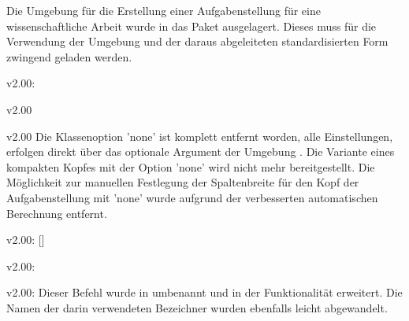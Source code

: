 \minisec{\taskname}
\begin{Bundle}{}
Die Umgebung für die Erstellung einer Aufgabenstellung für eine 
wissenschaftliche Arbeit wurde in das Paket  
ausgelagert. Dieses muss für die Verwendung der Umgebung  
und der daraus abgeleiteten standardisierten Form zwingend geladen werden.

\begin{Obsolete}{v2.00:}{}
\begin{Obsolete}{v2.00}{}
\begin{Obsolete}{v2.00}{}
\printobsoletelist%
%
Die Klassenoption 'none' ist komplett entfernt worden, alle 
Einstellungen, erfolgen direkt über das optionale Argument der Umgebung 
. Die Variante eines kompakten Kopfes mit der Option 
'none' wird nicht mehr bereitgestellt. Die Möglichkeit zur 
manuellen Festlegung der Spaltenbreite für den Kopf der Aufgabenstellung mit 
'none' wurde aufgrund der verbesserten automatischen 
Berechnung entfernt.
\end{Obsolete}
\end{Obsolete}
\end{Obsolete}

\begin{Obsolete}{v2.00:}{%
  []%
}
\begin{Obsolete}{v2.00:}{}
\begin{Obsolete}{v2.00:}{}
\printobsoletelist%
%
Dieser Befehl wurde in  umbenannt und in der Funktionalität 
erweitert. Die Namen der darin verwendeten Bezeichner wurden ebenfalls leicht 
abgewandelt.
\end{Obsolete}
\end{Obsolete}
\end{Obsolete}


\end{Bundle}
